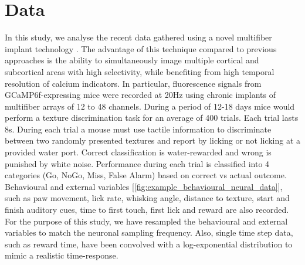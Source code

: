 \documentclass[a4paper,10pt]{article}
\begin{document}
\section{Data}
In this study, we analyse the recent data gathered using a novel multifiber implant technology \cite{sych_high-density_2019}. The advantage of this technique compared to previous approaches is the ability to simultaneously image multiple cortical and subcortical areas with high selectivity, while benefiting from high temporal resolution of calcium indicators. In particular, fluorescence signals from GCaMP6f-expressing mice were recorded at 20Hz using chronic implants of multifiber arrays of 12 to 48 channels. During a period of 12-18 days mice would perform a texture discrimination task for an average of 400 trials. Each trial lasts 8s. During each trial a mouse must use tactile information to discriminate between two randomly presented textures and report by licking or not licking at a provided water port. Correct classification is water-rewarded and wrong is punished by white noise. Performance during each trial is classified into 4 categories (Go, NoGo, Miss, False Alarm) based on correct vs actual outcome. Behavioural and external variables [\cref{fig:example_behavioural_neural_data}], such as paw movement, lick rate, whisking angle, distance to texture, start and finish auditory cues, time to first touch, first lick and reward are also recorded. For the purpose of this study, we have resampled the behavioural and external variables to match the neuronal sampling frequency. Also, single time step data, such as reward time, have been convolved with a log-exponential distribution to mimic a realistic time-response.
\end{document}
